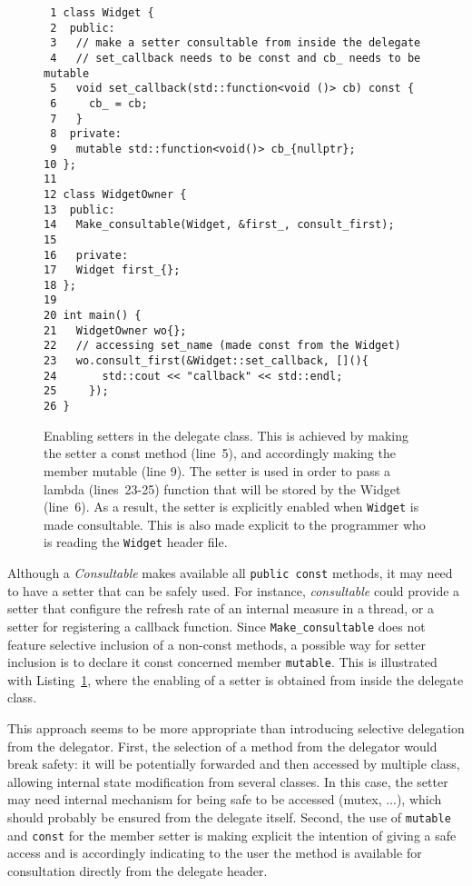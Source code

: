 \documentclass{article}
\begin{document}
\begin{figure}[ht]
{\small
\begin{lstlisting}
 1 class Widget {
 2  public:
 3   // make a setter consultable from inside the delegate 
 4   // set_callback needs to be const and cb_ needs to be mutable
 5   void set_callback(std::function<void ()> cb) const {
 6     cb_ = cb;
 7   }
 8  private:
 9   mutable std::function<void()> cb_{nullptr};
10 };
11 
12 class WidgetOwner {
13  public:
14   Make_consultable(Widget, &first_, consult_first);
15   
16   private:
17   Widget first_{};
18 };
19 
20 int main() {
21   WidgetOwner wo{};
22   // accessing set_name (made const from the Widget)
23   wo.consult_first(&Widget::set_callback, [](){
24       std::cout << "callback" << std::endl;
25     });
26 }
\end{lstlisting}}
\cprotect\caption{Enabling setters in the delegate class. This is achieved by making the setter a const method (line~5), and accordingly making the member mutable (line 9). The setter is used in order to pass a lambda (lines~23-25) function that will be stored by the Widget (line~6). As a result, the setter is explicitly enabled when \verb+Widget+ is made consultable. This is also made explicit to the programmer who is reading the \verb+Widget+ header file.}
\label{example:setters}
\end{figure}

Although a \textit{Consultable} makes available all \verb+public const+ methods, it may need to have a setter that can be safely used. For instance, \textit{consultable} could provide a setter that configure the refresh rate of an internal measure in a thread, or a setter for registering a callback function. Since \verb+Make_consultable+ does not feature selective inclusion of a non-const methods, a possible way for setter inclusion is to declare it const concerned member \verb+mutable+. This is illustrated with Listing~\ref{example:setters}, where the enabling of a setter is obtained from inside the delegate class. 

This approach seems to be more appropriate than introducing selective delegation from the delegator. First, the selection of a method from the delegator would break safety: it will be potentially forwarded and then accessed by multiple class, allowing internal state modification from several classes. In this case, the setter may need internal mechanism for being safe to be accessed (mutex, ...), which should probably be ensured from the delegate itself. Second, the use of \verb+mutable+ and \verb+const+ for the member setter is making explicit the intention of giving a safe access and is accordingly indicating to the user the method is available for consultation directly from the delegate header. 
\end{document}
